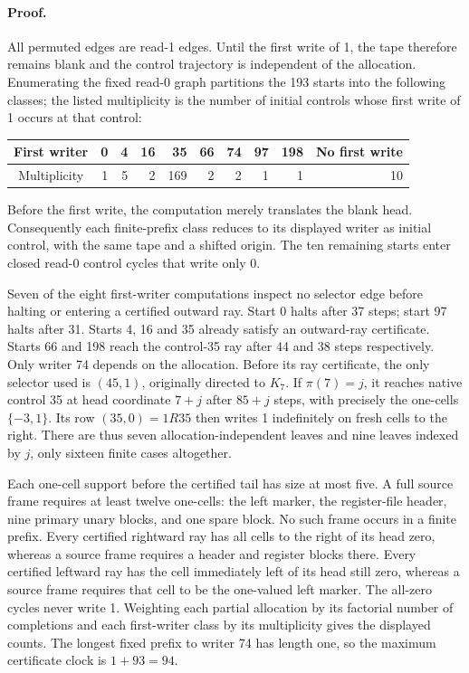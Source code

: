 \paragraph{Proof.}
All permuted edges are read-1 edges.  Until the first write of 1, the tape
therefore remains blank and the control trajectory is independent of the
allocation.  Enumerating the fixed read-0 graph partitions the 193 starts
into the following classes; the listed multiplicity is the number of
initial controls whose first write of 1 occurs at that control:
\begin{center}
\begin{tabular}{c|rrrrrrrr|r}
First writer &0&4&16&35&66&74&97&198&No first write\\\hline
Multiplicity&1&5&2&169&2&2&1&1&10
\end{tabular}
\end{center}
Before the first write, the computation merely translates the blank head.
Consequently each finite-prefix class reduces to its displayed writer as
initial control, with the same tape and a shifted origin.  The ten remaining
starts enter closed read-0 control cycles that write only 0.

Seven of the eight first-writer computations inspect no selector edge before
halting or entering a certified outward ray.  Start 0 halts after 37 steps;
start 97 halts after 31.  Starts 4, 16 and 35 already satisfy an outward-ray
certificate.  Starts 66 and 198 reach the control-35 ray after 44 and 38
steps respectively.  Only writer 74 depends on the allocation.  Before its
ray certificate, the only selector used is $(45,1)$, originally directed to
$K_7$.  If $\pi(7)=j$, it reaches native control 35 at head coordinate $7+j$
after $85+j$ steps, with precisely the one-cells $\{-3,1\}$.  Its row
$(35,0)=1R35$ then writes 1 indefinitely on fresh cells to the right.
There are thus seven allocation-independent leaves and nine leaves indexed
by $j$, only sixteen finite cases altogether.

Each one-cell support before the certified tail has size at most five.
A full source frame requires at least twelve one-cells: the left marker,
the register-file header, nine primary unary blocks, and one spare block.
No such frame occurs in a finite prefix.  Every certified rightward ray
has all cells to the right of its head zero, whereas a source frame requires
a header and register blocks there.  Every certified leftward ray has
the cell immediately left of its head still zero, whereas a source frame
requires that cell to be the one-valued left marker.
The all-zero cycles never write 1.  Weighting each partial allocation by its factorial
number of completions and each first-writer class by its multiplicity gives
the displayed counts.  The longest fixed prefix to writer 74 has length one,
so the maximum certificate clock is $1+93=94$.

